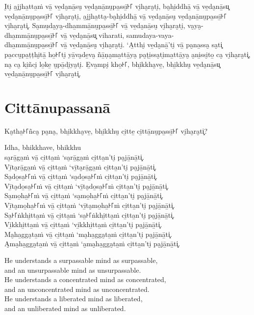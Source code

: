 \paliPage

I̮ti̮ a̱jjha̱tta̱ṁ vā̱ ve̱da̮nā̱su̮ ve̱da̮nā̱nu̮pa̱ssī̱꜔꜒ vi̮ha̮ra̮ti̮, ba̮hi̱ddhā̱ vā̱ ve̱da̮nā̱su͓
ve̱da̮nā̱nu̮pa̱ssī̱꜔꜒ vi̮ha̮ra̮ti̮, a̱jjha̱tta̮-ba̮hi̱ddhā̱ vā̱ ve̱da̮nā̱su̮ ve̱da̮nā̱nu̮pa̱ssī̱꜔꜒ vi̮ha̮ra̮ti͓.
Sa̮mu̮da̮ya̮-dha̱mmā̱nu̮pa̱ssī̱꜔꜒ vā̱ ve̱da̮nā̱su̮ vi̮ha̮ra̮ti̮, va̮ya̮-dha̱mmā̱nu̮pa̱ssī̱꜔꜒ vā̱ ve̱da̮nā̱su͓
viharati, samudaya-vaya-\\
dha̱mmā̱nu̮pa̱ssī̱꜔꜒ vā̱ ve̱da̮nā̱su̮ vi̮ha̮ra̮ti̮. ‘A̱tthi̮ ve̱da̮nā̱’ti̮ vā̱ pa̮na̱ssa̮ sa̮ti͓
pa̱ccu̮pa̱ṭṭhi̮tā̱ ho̱꜔꜒ti̮ yā̱va̮de̱va̮ ñā̱ṇa̮ma̱ttā̱ya̮ pa̮ṭi̱ssa̮ti̮ma̱ttā̱ya̮ a̮ni̱ssi̮to̱ ca̮ vi̮ha̮ra̮ti͓,
na̮ ca̮ ki̱ñci̮ lo̱ke̱ u̮pā̱di̮ya̮ti̮. E̱va̱mpi̮ kho̱꜔꜒, bhi̱kkha̮ve̱, bhi̱kkhu̮ ve̱da̮nā̱su͓
ve̱da̮nā̱nu̮pa̱ssī̱꜔꜒ vi̮ha̮ra̮ti͓.


\chapter*{Cittānupassanā}

Ka̮tha̱꜔꜒ñca̮ pa̮na̮, bhi̱kkha̮ve̱, bhi̱kkhu̮ ci̱tte̱ ci̱ttā̱nu̮pa̱ssī̱꜔꜒ vi̮ha̮ra̮ti͓?

Idha, bhikkhave, bhikkhu\\
sa̮rā̱ga̱ṁ vā̱ ci̱tta̱ṁ ‘sa̮rā̱ga̱ṁ ci̱tta̱n’ti̮ pa̮jā̱nā̱ti͓.\\
Vī̱ta̮rā̱ga̱ṁ vā̱ ci̱tta̱ṁ ‘vī̱ta̮rā̱ga̱ṁ ci̱tta̱n’ti̮ pa̮jā̱nā̱ti͓.\\
Sa̮do̱sa̱꜔꜒ṁ vā̱ ci̱tta̱ṁ ‘sa̮do̱sa̱꜔꜒ṁ ci̱tta̱n’ti̮ pa̮jā̱nā̱ti͓.\\
Vī̱ta̮do̱sa̱꜔꜒ṁ vā̱ ci̱tta̱ṁ ‘vī̱ta̮do̱sa̱꜔꜒ṁ ci̱tta̱n’ti̮ pa̮jā̱nā̱ti͓.\\
Sa̮mo̱ha̱꜔꜒ṁ vā̱ ci̱tta̱ṁ ‘sa̮mo̱ha̱꜔꜒ṁ ci̱tta̱n’ti̮ pa̮jā̱nā̱ti͓.\\
Vī̱ta̮mo̱ha̱꜔꜒ṁ vā̱ ci̱tta̱ṁ ‘vī̱ta̮mo̱ha̱꜔꜒ṁ ci̱tta̱n’ti̮ pa̮jā̱nā̱ti͓.\\
Sa̱꜔꜒ṅkhi̱tta̱ṁ vā̱ ci̱tta̱ṁ ‘sa̱꜔꜒ṅkhi̱tta̱ṁ ci̱tta̱n’ti̮ pa̮jā̱nā̱ti͓.\\
Vi̱kkhi̱tta̱ṁ vā̱ ci̱tta̱ṁ ‘vi̱kkhi̱tta̱ṁ ci̱tta̱n’ti̮ pa̮jā̱nā̱ti͓.\\
Ma̮ha̱gga̮ta̱ṁ vā̱ ci̱tta̱ṁ ‘ma̮ha̱gga̮ta̱ṁ ci̱tta̱n’ti̮ pa̮jā̱nā̱ti͓.\\
A̮ma̮ha̱gga̮ta̱ṁ vā̱ ci̱tta̱ṁ ‘a̮ma̮ha̱gga̮ta̱ṁ ci̱tta̱n’ti̮ pa̮jā̱nā̱ti͓.

\englishPage

He understands a surpassable mind as surpassable,\\
and an unsurpassable mind as unsurpassable.\\
He understands a concentrated mind as concentrated,\\
and an unconcentrated mind as unconcentrated.\\
He understands a liberated mind as liberated,\\
and an unliberated mind as unliberated.

